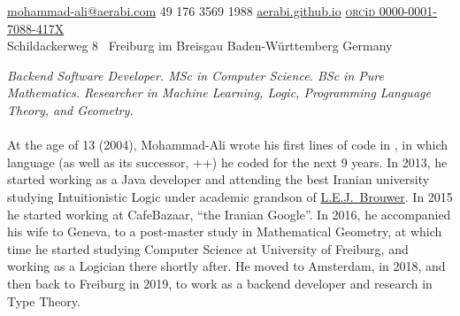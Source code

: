 \documentclass[10pt,a4paper]{article}
\begin{document}
\sloppy  %



\nobreakvspace{0.3em}  %

\noindent\href{mailto:aerabi.at.gmx.dot.de}{mohammad-ali\mbox{}@\mbox{}aerabi.com}\sbull
\textsmaller{+}49 176 3569 1988\sbull
\href{http://aerabi.github.io}{aerabi.github.io}\sbull 
\href{https://orcid.org/0000-0001-7088-417X}{\textsc{orc}i\textsc{d} 0000-0001-7088-417X} \\
Schildackerweg 8 \thinspace\ {\sc Freiburg im Breisgau}\sbull
Baden-W\"urttemberg\sbull
{\sc Germany}

\spacedhrule{0.9em}{-0.4em}  %


\vspace{-1.3em}  %
\begin{multicols}{2}  %
\noindent \emph{%
Backend Software Developer.
MSc in Computer Science. BSc in Pure Mathematics. Researcher in Machine Learning, Logic, Programming Language Theory, and Geometry.}
\\
\\
At the age of 13 (2004), Mohammad-Ali wrote his first lines of code in , in which language (as well as its successor, ++) he coded for the next 9 years. In 2013, he started working as a Java developer and attending the best Iranian university studying Intuitionistic Logic under academic grandson of \href{https://en.wikipedia.org/wiki/L._E._J._Brouwer}{L.E.J.~Brouwer}. In 2015 he started working at CafeBazaar, ``the Iranian Google''.
In 2016, he accompanied his wife to Geneva, to a post-master study in Mathematical Geometry, at which time he started studying Computer Science at University of Freiburg, and working as a Logician there shortly after. He moved to Amsterdam, in 2018, and then back to Freiburg in 2019, to work as a backend developer and research in Type Theory.

\end{multicols}
\end{document}
